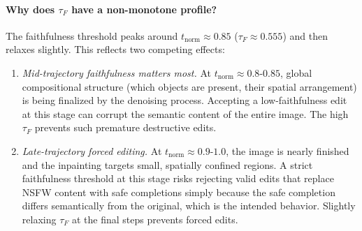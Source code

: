 \paragraph{Why does $\tau_F$ have a non-monotone profile?}
The faithfulness threshold peaks around $t_\text{norm} \approx 0.85$
($\tau_F \approx 0.555$) and then relaxes slightly.
This reflects two competing effects:
\begin{enumerate}[leftmargin=1.5em,itemsep=2pt]
  \item \textit{Mid-trajectory faithfulness matters most.} At
        $t_\text{norm} \approx 0.8$-$0.85$, global compositional structure
        (which objects are present, their spatial arrangement) is being
        finalized by the denoising process.
        Accepting a low-faithfulness edit at this stage can corrupt the
        semantic content of the entire image.
        The high $\tau_F$ prevents such premature destructive edits.
  \item \textit{Late-trajectory forced editing.} At $t_\text{norm}
        \approx 0.9$-$1.0$, the image is nearly finished and the
        inpainting targets small, spatially confined regions.
        A strict faithfulness threshold at this stage risks rejecting
        valid edits that replace NSFW content with safe completions
        simply because the safe completion differs semantically from
        the original, which is the intended behavior.
        Slightly relaxing $\tau_F$ at the final steps prevents
        forced edits.
\end{enumerate}


